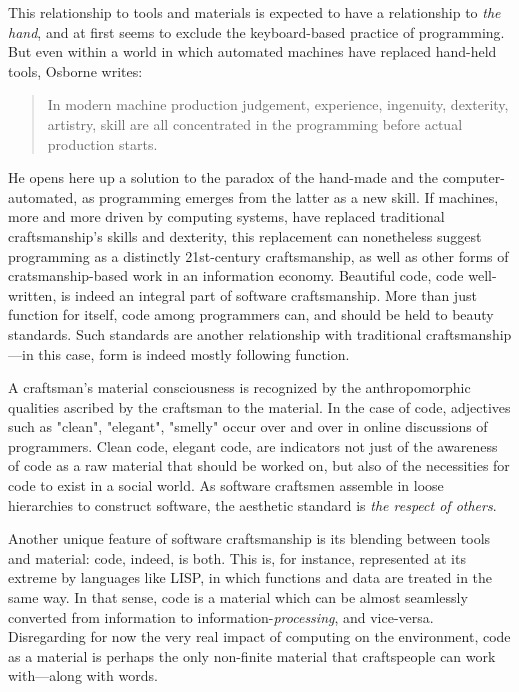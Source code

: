 \documentclass{article}
\begin{document}
This relationship to tools and materials is expected to have a relationship to \emph{the hand}, and at first seems to exclude the keyboard-based practice of programming. But even within a world in which automated machines have replaced hand-held tools, Osborne writes:

\begin{quote}
    In modern machine production judgement, experience, ingenuity, dexterity, artistry, skill are all concentrated in the programming before actual production starts.\cite{osborne_aesthetic_1977}
\end{quote}

He opens here up a solution to the paradox of the hand-made and the computer-automated, as programming emerges from the latter as a new skill. If machines, more and more driven by computing systems, have replaced traditional craftsmanship's skills and dexterity, this replacement can nonetheless suggest programming as a distinctly 21st-century craftsmanship, as well as other forms of cratsmanship-based work in an information economy.
Beautiful code, code well-written, is indeed an integral part of software craftsmanship\cite{oram_beautiful_2007}. More than just function for itself, code among programmers can, and should be held to beauty standards\cite{pineiro_aesthetics_2003}. Such standards are another relationship with traditional craftsmanship—in this case, form is indeed mostly following function.

A craftsman's material consciousness is recognized by the anthropomorphic qualities ascribed by the craftsman to the material. In the case of code, adjectives such as "clean", "elegant", "smelly" occur over and over in online discussions of programmers. Clean code, elegant code, are indicators not just of the awareness of code as a raw material that should be worked on, but also of the necessities for code to exist in a social world. As software craftsmen assemble in loose hierarchies to construct software, the aesthetic standard is \emph{the respect of others}\cite{abelson_structure_1979}.

Another unique feature of software craftsmanship is its blending between tools and material: code, indeed, is both. This is, for instance, represented at its extreme by languages like LISP, in which functions and data are treated in the same way\cite{mccarthy_lisp_1965}. In that sense, code is a material which can be almost seamlessly converted from information to information-\emph{processing}, and vice-versa. Disregarding for now the very real impact of computing on the environment, code as a material is perhaps the only non-finite material that craftspeople can work with—along with words.
\end{document}
